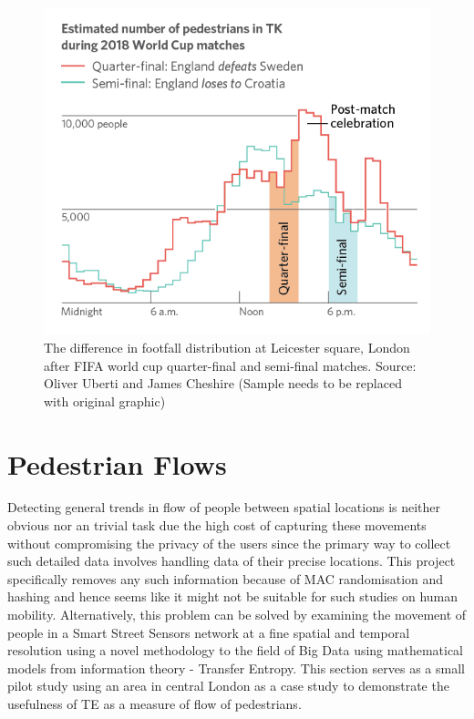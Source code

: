 \begin{figure}
  \forceversofloat
  \includegraphics[trim={0 0 0 0},clip]{images/applications-football-sample.png}
  \caption{The difference in footfall distribution at Leicester square, London after FIFA world cup quarter-final and semi-final matches. Source: Oliver Uberti and James Cheshire (Sample needs to be replaced with original graphic)}
  \label{figure:applications:football}
\end{figure}


\section{Pedestrian Flows}
Detecting general trends in flow of people between spatial locations is neither obvious nor an trivial task due the high cost of capturing these movements without compromising the privacy of the users since the primary way to collect such detailed data involves handling data of their precise locations.
This project specifically removes any such information because of MAC randomisation and hashing and hence seems like it might not be suitable for such studies on human mobility.
Alternatively, this problem can be solved by examining the movement of people in a Smart Street Sensors network at a fine spatial and temporal resolution using a novel methodology to the field of Big Data using mathematical models from information theory  - Transfer Entropy.
This section serves as a small pilot study using an area in central London as a case study to demonstrate the usefulness of TE as a measure of flow of pedestrians.

